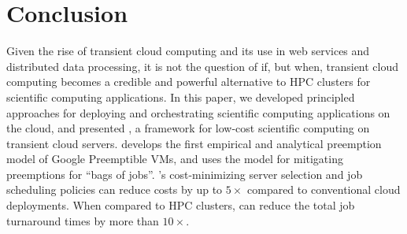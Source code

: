 
\section{Conclusion}
\label{sec:conclusion}
Given the rise of transient cloud computing and its use in web services and distributed data processing, it is not the question of if, but when, transient cloud computing becomes a credible and powerful alternative to HPC clusters for scientific computing applications. 
In this paper, we developed principled approaches for deploying and orchestrating scientific computing applications on the cloud, and presented \sysname, a framework for low-cost scientific computing on  transient cloud servers. 
\sysname develops the first empirical and analytical preemption model of Google Preemptible VMs, and uses the model for mitigating preemptions for ``bags of jobs''. 
\sysname's cost-minimizing server selection and job scheduling policies can reduce costs by up to $5\times$ compared to conventional cloud deployments.
When compared to HPC clusters, \sysname can reduce the total job turnaround times by more than $10\times$. 


